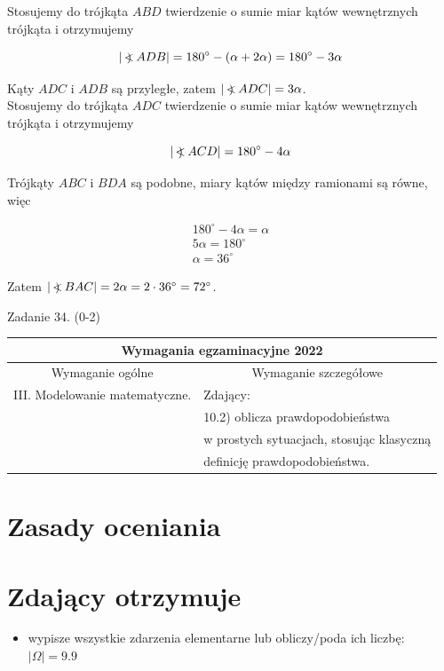 \documentclass[10pt]{article}
\newcommand\Varangle{\mathop{{<\!\!\!\!\!\text{\small)}}\:}\nolimits}
\begin{document}
Stosujemy do trójkąta $A B D$ twierdzenie o sumie miar kątów wewnętrznych trójkąta i otrzymujemy

$$
|\Varangle A D B|=180^{\circ}-(\alpha+2 \alpha)=180^{\circ}-3 \alpha
$$

Kąty $A D C$ i $A D B$ są przyległe, zatem $|\Varangle A D C|=3 \alpha$.\\
Stosujemy do trójkąta $A D C$ twierdzenie o sumie miar kątów wewnętrznych trójkąta i otrzymujemy

$$
|\Varangle A C D|=180^{\circ}-4 \alpha
$$

Trójkąty $A B C$ i $B D A$ są podobne, miary kątów między ramionami są równe, więc

$$
\begin{gathered}
180^{\circ}-4 \alpha=\alpha \\
5 \alpha=180^{\circ} \\
\alpha=36^{\circ}
\end{gathered}
$$

Zatem $|\Varangle B A C|=2 \alpha=2 \cdot 36^{\circ}=72^{\circ}$.

Zadanie 34. (0-2)

\begin{center}
\begin{tabular}{|l|l|}
\hline
\multicolumn{2}{|c|}{Wymagania egzaminacyjne 2022} \\
\hline
\multicolumn{1}{|c|}{Wymaganie ogólne} & \multicolumn{1}{c|}{Wymaganie szczegółowe} \\
\hline
III. Modelowanie matematyczne. & Zdający: \\
 & 10.2) oblicza prawdopodobieństwa \\
 & w prostych sytuacjach, stosując klasyczną \\
 & definicję prawdopodobieństwa. \\
\hline
\end{tabular}
\end{center}

\section*{Zasady oceniania}
\section*{Zdający otrzymuje}
\begin{itemize}
  \item wypisze wszystkie zdarzenia elementarne lub obliczy/poda ich liczbę: $|\Omega|=9.9$
\end{itemize}
\end{document}
